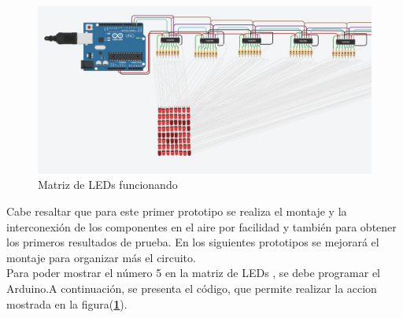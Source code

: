 \documentclass{article}
\begin{document}
    \begin{figure}[h]
    \includegraphics[width=14cm]{montaje5.jpeg}
    \centering
    \caption{Matriz de LEDs funcionando}
    \label{montaje5}
    \end{figure}
    
Cabe resaltar que para este primer prototipo se realiza el montaje y la interconexión de los componentes en el aire por facilidad y también para  obtener los primeros resultados de prueba. En los siguientes prototipos se mejorará el montaje para organizar más el circuito.\\


Para poder mostrar el número 5 en la matriz de LEDs , se debe programar el Arduino.A continuación, se presenta el código, que permite realizar la accion mostrada en la figura(\textbf{\ref{montaje5}}).
\end{document}
